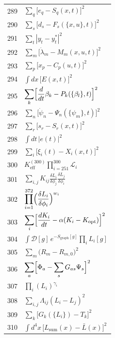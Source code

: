 \documentclass[12pt,a4paper]{article}
\begin{document}
\begin{longtable}{r p{}}
		289 & \(\displaystyle \sum_q\bigl[e_q - S_q(x,t)\bigr]^2\) \\
		290 & \(\displaystyle \sum_s\bigl[d_s - F_s(\{x,u\},t)\bigr]^2\) \\
		291 & \(\displaystyle \sum_t|y_t - y_t^*|^2\) \\
		292 & \(\displaystyle \sum_m\bigl[\dot\lambda_m - M_m(x,u,t)\bigr]^2\) \\
		293 & \(\displaystyle \sum_p\bigl[x_p - C_p(u,t)\bigr]^2\) \\
		294 & \(\displaystyle \int dx\,\bigl[E(x,t)\bigr]^2\) \\
		295 & \(\displaystyle \sum_k\Bigl[\frac{d}{dt}\beta_k - P_k(\{\beta_l\},t)\Bigr]^2\) \\
		296 & \(\displaystyle \sum_n\bigl[\dot\psi_n - \Psi_n(\{\psi_m\},t)\bigr]^2\) \\
		297 & \(\displaystyle \sum_r\bigl[s_r - S_r(x,t)\bigr]^2\) \\
		298 & \(\displaystyle \int dt\,|e(t)|^2\) \\
		299 & \(\displaystyle \sum_i\bigl[\xi_i(t) - X_i(x,t)\bigr]^2\) \\
		300 & \(\displaystyle K^{(300)}_{\mathrm{eff}}\prod_{i=251}^{300}\mathcal{L}_i\) \\
		301 & \(\displaystyle \sum_{i,j}K_{ij}\frac{\delta L_i}{\delta\phi_j}\frac{\delta L_j}{\delta\phi_i}\) \\
		302 & \(\displaystyle \prod_{i=1}^{372}\Bigl(\frac{\delta L_i}{\delta\phi_i}\Bigr)^{w_i}\) \\
		303 & \(\displaystyle \sum_i\Bigl[\frac{dK_i}{dt} - \alpha(K_i - K_{\text{opt}})\Bigr]^2\) \\
		304 & \(\displaystyle \int\mathcal{D}[g]\,e^{-S_{\text{graph}}[g]}\prod_i L_i[g]\) \\
		305 & \(\displaystyle \sum_m\bigl(R_m - R_{m,0}\bigr)^2\) \\
		306 & \(\displaystyle \sum_a\Bigl[\Phi_a - \sum_s G_{as}\Psi_s\Bigr]^2\) \\
		307 & \(\displaystyle \prod_i(L_i)^{\gamma_i}\) \\
		308 & \(\displaystyle \sum_{i,j}\Lambda_{ij}(L_i - L_j)^2\) \\
		309 & \(\displaystyle \sum_k\bigl[G_k(\{L_i\}) - T_k\bigr]^2\) \\
		310 & \(\displaystyle \int d^4x\,\bigl[L_{\text{sum}}(x) - \bar L(x)\bigr]^2\) \\

\end{longtable}
\end{document}
